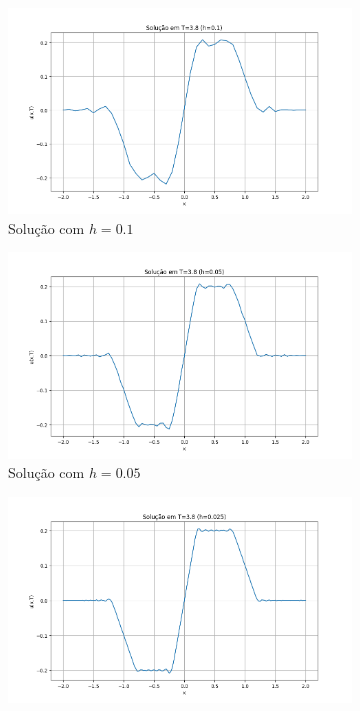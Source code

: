 \documentclass[column,amsmath,amssymb,floatfix]{revtex4}
\begin{document}
\begin{figure}[H]
 \centering
 \begin{subfigure}{0.35\textwidth}
     \includegraphics[width=\textwidth]{img/ex0201.png}
     \caption{Solução com $h=0.1$}
     \label{fig:ex2_1}
 \end{subfigure}
 \begin{subfigure}{0.35\textwidth}
     \includegraphics[width=\textwidth]{img/ex0202.png}
     \caption{Solução com $h=0.05$}
     \label{fig:ex2_2}
 \end{subfigure}
 \begin{subfigure}{0.35\textwidth}
     \includegraphics[width=\textwidth]{img/ex0203.png}

\end{subfigure}
\end{figure}
\end{document}
